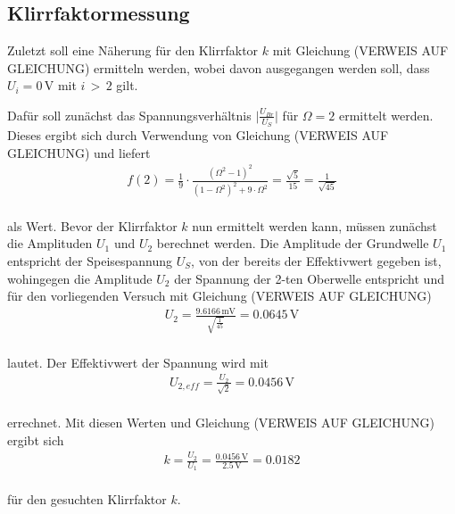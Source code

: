 \subsection{Klirrfaktormessung}

Zuletzt soll eine Näherung für den Klirrfaktor $k$ mit Gleichung (VERWEIS AUF GLEICHUNG) ermitteln werden, wobei 
davon ausgegangen werden soll, dass $U_{i} = 0\, \si{\volt}$ mit $i\,>\,2$ gilt.  

Dafür soll zunächst das Spannungsverhältnis $\lvert{\frac{U_{Br}}{U_S}}\rvert$ für $\Omega = 2$ ermittelt werden. Dieses ergibt sich 
durch Verwendung von Gleichung (VERWEIS AUF GLEICHUNG) und liefert 
\begin{align}
f(2) =  \frac{1}{9} \cdot \frac{(\Omega^2 - 1)^2}{(1 - \Omega^2)^2 + 9 \cdot \Omega^2}  = \frac{\sqrt{5}}{15} = \frac{1}{\sqrt{45}} \nonumber
\end{align}
\\
als Wert. Bevor der Klirrfaktor $k$ nun ermittelt werden kann, müssen zunächst die Amplituden $U_{1}$ und $U_{2}$ berechnet werden.
Die Amplitude der Grundwelle $U_{1}$ entspricht der Speisespannung $U_{S}$, von der bereits der Effektivwert gegeben ist, wohingegen die Amplitude $U_{2}$ der Spannung der
2-ten Oberwelle entspricht und für den vorliegenden Versuch mit Gleichung (VERWEIS AUF GLEICHUNG)
\begin{align}
U_{2} = \frac{9.6166\, \si{\milli\volt}}{\sqrt{\frac{1}{45}}} = 0.0645\, \si{\volt} \nonumber
\end{align}
\\
lautet. Der Effektivwert der Spannung wird mit 
\begin{align}
U_{2,eff} = \frac{U_{2}}{\sqrt{2}} = 0.0456\, \si{\volt} \nonumber
\end{align}
\\
errechnet.
Mit diesen Werten und Gleichung (VERWEIS AUF GLEICHUNG) ergibt sich 
\begin{align}
k = \frac{U_{2}}{U_{1}} = \frac{0.0456\, \si{\volt}}{2.5\, \si{\volt}} = 0.0182 \nonumber
\end{align}
\\ 
für den gesuchten Klirrfaktor $k$.